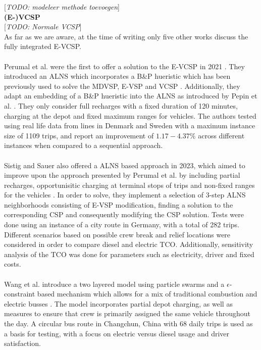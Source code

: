 \documentclass[ht]{article}
\newcommand{\todo}[1]{{\color{red}[\textit{TODO: #1}]}}
\begin{document}
\todo{modeleer methode toevoegen}\\

\noindent \textbf{(E-)VCSP}\\
\todo{Normale VCSP}\\
As far as we are aware, at the time of writing only five other works discuss the fully integrated E-VCSP. \\\\

Perumal et al. were the first to offer a solution to the E-VCSP in 2021
\cite{Perumal2021}. They introduced an ALNS which incorporates a B\&P hueristic
which has been previously used to solve the MDVSP, E-VSP and VCSP
\cite{Pepin2009, Haase1996, vanKootenNiekerk2017}. Additionally, they adapt an
embedding of a B\&P hueristic into the ALNS as introduced by Pepin et al.
\cite{Pepin2009}. They only consider full recharges with a fixed duration of
120 minutes, charging at the depot and fixed maximum ranges for vehicles. The
authors tested using real life data from lines in Denmark and Sweden with a
maximum instance size of 1109 trips, and report an improvement of $1.17-4.37\%$
across different instances when compared to a sequential approach. \\\\

Sistig and Sauer also offered a ALNS based approach in 2023, which aimed to
improve upon the approach presented by Perumal et al. by including partial
recharges, opportunisitic charging at terminal stops of trips and non-fixed
ranges for the vehicles \cite{Sistig2023}. In order to solve, they implement a
selection of 3-step ALNS neighborhoods consisting of E-VSP modification,
finding a solution to the corresponding CSP and consequently modifying the CSP
solution. Tests were done using an instance of a city route in Germany, with a
total of 282 trips. Different scenarios based on possible crew break and relief
locations were considered in order to compare diesel and electric TCO.
Additionally, sensitivity analysis of the TCO was done for parameters such as
electricity, driver and fixed costs. \\\\

Wang et al. introduce a two layered model using particle swarms and a
$\epsilon$-constraint based mechanism which allows for a mix of traditional
combustion and electric busses \cite{Wang2022}. The model incorporates partial
depot charging, as well as measures to ensure that crew is primarily assigned
the same vehicle throughout the day. A circular bus route in Changchun, China
with 68 daily trips is used as a basis for testing, with a focus on electric
versus diesel usage and driver satisfaction. \\\\
\end{document}
